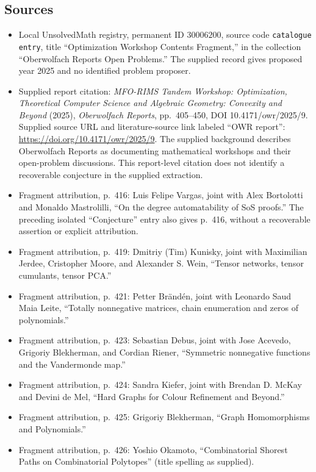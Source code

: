 \documentclass[11pt]{article}
\begin{document}
\subsection{Sources}
\begin{itemize}
\item Local UnsolvedMath registry, permanent ID \(30006200\), source code \texttt{catalogue entry}, title ``Optimization Workshop Contents Fragment,'' in the collection ``Oberwolfach Reports Open Problems.'' The supplied record gives proposed year 2025 and no identified problem proposer.
\item Supplied report citation: \emph{MFO-RIMS Tandem Workshop: Optimization, Theoretical Computer Science and Algebraic Geometry: Convexity and Beyond} (2025), \emph{Oberwolfach Reports}, pp.\ 405--450, DOI 10.4171/owr/2025/9. Supplied source URL and literature-source link labeled ``OWR report'': \url{https://doi.org/10.4171/owr/2025/9}. The supplied background describes Oberwolfach Reports as documenting mathematical workshops and their open-problem discussions. This report-level citation does not identify a recoverable conjecture in the supplied extraction.
\item Fragment attribution, p.\ 416: Luis Felipe Vargas, joint with Alex Bortolotti and Monaldo Mastrolilli, ``On the degree automatability of SoS proofs.'' The preceding isolated ``Conjecture'' entry also gives p.\ 416, without a recoverable assertion or explicit attribution.
\item Fragment attribution, p.\ 419: Dmitriy (Tim) Kunisky, joint with Maximilian Jerdee, Cristopher Moore, and Alexander S. Wein, ``Tensor networks, tensor cumulants, tensor PCA.''
\item Fragment attribution, p.\ 421: Petter Brändén, joint with Leonardo Saud Maia Leite, ``Totally nonnegative matrices, chain enumeration and zeros of polynomials.''
\item Fragment attribution, p.\ 423: Sebastian Debus, joint with Jose Acevedo, Grigoriy Blekherman, and Cordian Riener, ``Symmetric nonnegative functions and the Vandermonde map.''
\item Fragment attribution, p.\ 424: Sandra Kiefer, joint with Brendan D. McKay and Devini de Mel, ``Hard Graphs for Colour Refinement and Beyond.''
\item Fragment attribution, p.\ 425: Grigoriy Blekherman, ``Graph Homomorphisms and Polynomials.''
\item Fragment attribution, p.\ 426: Yoshio Okamoto, ``Combinatorial Shorest Paths on Combinatorial Polytopes'' (title spelling as supplied).

\end{itemize}
\end{document}
